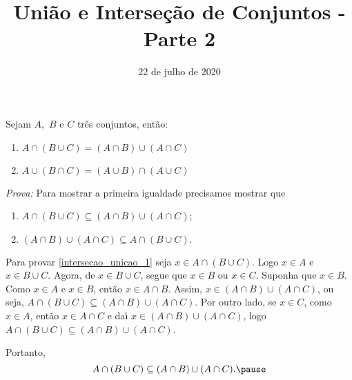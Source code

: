\documentclass{beamer}
\title{Uni\~ao e Interse\c{c}\~ao de Conjuntos - Parte 2}
\author[\autor]{\autor}
\institute[\instituto]{\instituto}
\date{22 de julho de 2020}
\begin{document}
    \begin{frame}
        \maketitle
    \end{frame}


    \begin{frame}
        \begin{proposicao} Sejam $A,$ $B$ e $C$ tr{\^e}s conjuntos, ent{\~a}o:\pause
            \begin{enumerate}[label={\roman*})]
                \item $A \cap ( B \cup C) = (A \cap B) \cup (A \cap C)$\pause
                \item $A \cup (B \cap C) = (A \cup B) \cap (A \cup C)$\pause
            \end{enumerate}
        \end{proposicao}
        \textit{Prova:} \pause
        Para mostrar a primeira igualdade precisamos mostrar que\pause
        \begin{enumerate}[label=({\arabic*})]
            \item $A \cap (B \cup C) \subseteq (A \cap B) \cup ( A \cap C)$;\label{intersecao_unicao_1}\pause
            \item $(A \cap B) \cup (A \cap C) \subseteq A \cap (B \cup C).$\label{intersecao_unicao_2}\pause
        \end{enumerate}

        Para provar \ref{intersecao_unicao_1} seja $x\in A \cap (B \cup C)$. \pause Logo $x \in A$ \pause e $x \in B \cup C$. \pause Agora, de $x \in B \cup C$, \pause segue que $x \in B$ \pause ou $x \in C$. \pause Suponha que $x \in B$. \pause Como $x \in A$ e $x \in B$, \pause ent\~ao $x \in A \cap B$. \pause Assim, $x \in (A \cap B) \cup (A \cap C)$, \pause ou seja, $A \cap (B \cup C) \subseteq (A \cap B) \cup (A \cap C)$. \pause Por outro lado, se $x \in C$, \pause como $x \in A$, ent{\~a}o $x \in A \cap C$ \pause e da{\'\i} $x \in (A \cap B) \cup (A \cap C)$, \pause logo $A \cap (B \cup C)\subseteq (A \cap B) \cup (A \cap C)$.\pause

        Portanto,
        \[
            A \cap (B \cup C) \subseteq (A \cap B) \cup (A \cap C).\pause
        \]
    \end{frame}
\end{document}
